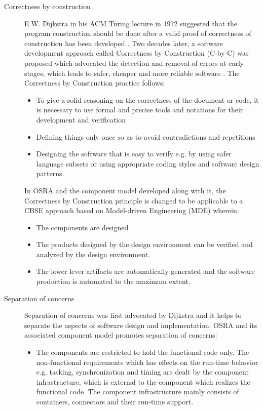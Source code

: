 \begin{description}
\item[Correctness by construction] E.W. Dijkstra in his ACM Turing lecture in 1972 suggested that the program construction should be done after a valid proof of correctness of construction has been developed \cite{CompBasedProcess}. Two decades later, a software development approach called Correctness by Construction (C-by-C) was proposed which advocated the detection and removal of errors at early stages, which leads to safer, cheaper and more reliable software \cite{CompBasedProcess} \cite{PhdThesis}. The Correctness by Construction practice follows:
\begin{itemize}
\item To give a solid reasoning on the correctness of the document or code, it is necessary to use formal and precise tools and notations for their development and verification 
\item Defining things only once so as to avoid contradictions and repetitions
\item Designing the software that is easy to verify e.g. by using safer language subsets or using appropriate coding styles and software design patterns. 
\end{itemize}

In OSRA and the component model developed along with it, the Correctness by Construction principle is changed to be applicable to a CBSE approach based on Model-driven Engineering (MDE) \cite{CompBasedProcess} wherein:

\begin{itemize}
\item The components are designed
\item The products designed by the design environment can be verified and analyzed by the design environment.
\item The lower lever artifacts are automatically generated and the software production is automated to the maximum extent.  
\end{itemize}

\item [Separation of concerns] 
\label{section: Founding principle-Separation of concerns} 
Separation of concerns was first advocated by Dijkstra \cite{CompBasedProcess} and it helps to separate the aspects of software design and implementation. OSRA and its associated component model promotes separation of concerns\cite{CompBasedProcess}\cite{PhdThesis}:

\begin{itemize}
\item The components are restricted to hold the functional code only. The non-functional requirements which has effects on the run-time behavior e.g. tasking, synchronization and timing are dealt by the component infrastructure, which is external to the component which realizes the functional code. The component infrastructure mainly consists of containers, connectors and their run-time support.


\end{itemize}
\end{description}
